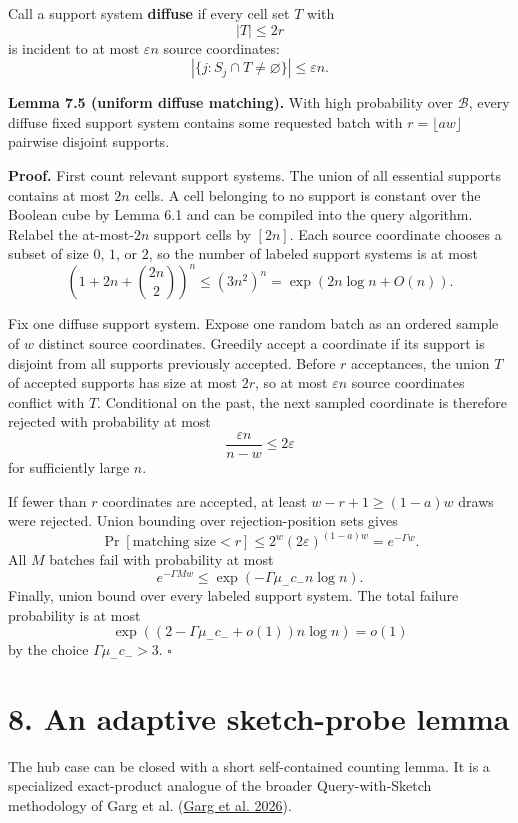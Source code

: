 \documentclass[
]{article}
\begin{document}
Call a support system \textbf{diffuse} if every cell set \(T\) with \[
|T|\le2r
\] is incident to at most \(\varepsilon n\) source coordinates: \[
|\{j:S_j\cap T\ne\varnothing\}|\le\varepsilon n.
\]

\textbf{Lemma 7.5 (uniform diffuse matching).} With high probability
over \(\mathcal B\), every diffuse fixed support system contains some
requested batch with \(r=\lfloor aw\rfloor\) pairwise disjoint supports.

\textbf{Proof.} First count relevant support systems. The union of all
essential supports contains at most \(2n\) cells. A cell belonging to no
support is constant over the Boolean cube by Lemma 6.1 and can be
compiled into the query algorithm. Relabel the at-most-\(2n\) support
cells by \([2n]\). Each source coordinate chooses a subset of size
\(0\), \(1\), or \(2\), so the number of labeled support systems is at
most \[
\left(1+2n+\binom{2n}{2}\right)^n
\le
(3n^2)^n
=
\exp(2n\log n+O(n)).
\]

Fix one diffuse support system. Expose one random batch as an ordered
sample of \(w\) distinct source coordinates. Greedily accept a
coordinate if its support is disjoint from all supports previously
accepted. Before \(r\) acceptances, the union \(T\) of accepted supports
has size at most \(2r\), so at most \(\varepsilon n\) source coordinates
conflict with \(T\). Conditional on the past, the next sampled
coordinate is therefore rejected with probability at most \[
\frac{\varepsilon n}{n-w}\le2\varepsilon
\] for sufficiently large \(n\).

If fewer than \(r\) coordinates are accepted, at least
\(w-r+1\ge(1-a)w\) draws were rejected. Union bounding over
rejection-position sets gives \[
\Pr[\text{matching size}<r]
\le
2^w(2\varepsilon)^{(1-a)w}
=
e^{-\Gamma w}.
\] All \(M\) batches fail with probability at most \[
e^{-\Gamma Mw}
\le
\exp(-\Gamma\mu_-c_-n\log n).
\] Finally, union bound over every labeled support system. The total
failure probability is at most \[
\exp\left((2-\Gamma\mu_-c_-+o(1))n\log n\right)=o(1)
\] by the choice \(\Gamma\mu_-c_->3\). \(\square\)

\hypertarget{an-adaptive-sketch-probe-lemma}{%
\section{8. An adaptive sketch-probe
lemma}\label{an-adaptive-sketch-probe-lemma}}

The hub case can be closed with a short self-contained counting lemma.
It is a specialized exact-product analogue of the broader
Query-with-Sketch methodology of Garg et al.
(\protect\hyperlink{ref-garg2026qws}{Garg et al. 2026}).
\end{document}
